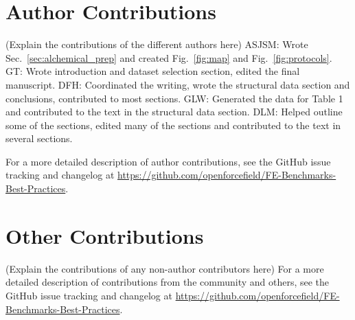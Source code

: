 \documentclass[9pt,bestpractices]{livecoms}
\newcommand{\githubrepository}{\url{https://github.com/openforcefield/FE-Benchmarks-Best-Practices}}  %
\begin{document}
\section{Author Contributions}
%

(Explain the contributions of the different authors here)
ASJSM: Wrote Sec.~\ref{sec:alchemical_prep} and created Fig.~\ref{fig:map} and Fig.~\ref{fig:protocols}. 
GT: Wrote introduction and dataset selection section, edited the final manuscript.
DFH: Coordinated the writing, wrote the structural data section and conclusions, contributed to most sections.
GLW: Generated the data for Table 1 and contributed to the text in the structural data section.
DLM: Helped outline some of the sections, edited many of the sections and contributed to the text in several sections.

For a more detailed description of author contributions,
see the GitHub issue tracking and changelog at \githubrepository.


\section{Other Contributions}
%

(Explain the contributions of any non-author contributors here)
For a more detailed description of contributions from the community and others, see the GitHub issue tracking and changelog at \githubrepository.
\end{document}
